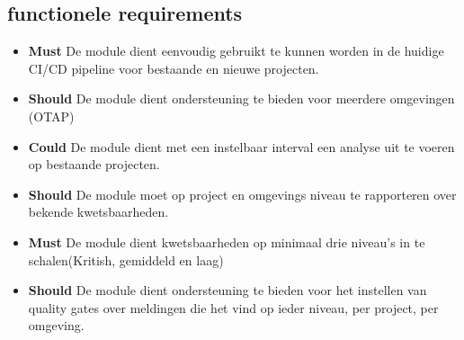 \subsection{functionele requirements}\label{subsec:functionele-requirements}
\begin{itemize}
    \item \textbf{Must} De module dient eenvoudig gebruikt te kunnen worden in de huidige CI/CD pipeline voor bestaande en nieuwe projecten.
    \item \textbf{Should} De module dient ondersteuning te bieden voor meerdere omgevingen (OTAP)
    \item \textbf{Could} De module dient met een instelbaar interval een analyse uit te voeren op bestaande projecten.
    \item \textbf{Should} De module moet op project en omgevings niveau te rapporteren over bekende kwetsbaarheden.
    \item \textbf{Must} De module dient kwetsbaarheden op minimaal drie niveau's in te schalen(Kritish, gemiddeld en laag)
    \item \textbf{Should} De module dient ondersteuning te bieden voor het instellen van quality gates over meldingen die het vind op ieder niveau, per project, per omgeving.
\end{itemize}

